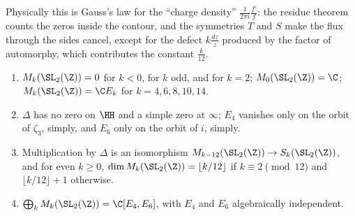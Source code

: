 Physically this is Gauss's law for the ``charge density'' $\frac1{2\pi i}\frac{f'}f$: the residue theorem counts the zeros inside the contour, and the symmetries $T$ and $S$
make the flux through the sides cancel, except for the defect $k\frac{dz}z$ produced by the factor of automorphy, which contributes the constant $\frac k{12}$.

\begin{corollary}\label{cor:modforms:level-one-structure}
\begin{enumerate}[label=(\roman*)]
\item $M_k(\SL_2(\Z))=0$ for $k<0$, for $k$ odd, and for $k=2$; $M_0(\SL_2(\Z))=\C$; $M_k(\SL_2(\Z))=\C E_k$ for $k=4,6,8,10,14$.
\item $\Delta$ has no zero on $\HH$ and a simple zero at $\infty$; $E_4$ vanishes only on the orbit of $\zeta_3$, simply, and $E_6$ only on the orbit of $i$, simply.
\item Multiplication by $\Delta$ is an isomorphism $M_{k-12}(\SL_2(\Z))\to S_k(\SL_2(\Z))$, and for even $k\ge0$, $\dim M_k(\SL_2(\Z))=\lfloor k/12\rfloor$ if $k\equiv2\pmod{12}$ and
$\lfloor k/12\rfloor+1$ otherwise.
\item $\bigoplus_kM_k(\SL_2(\Z))=\C[E_4,E_6]$, with $E_4$ and $E_6$ algebraically independent.
\end{enumerate}
\end{corollary}

